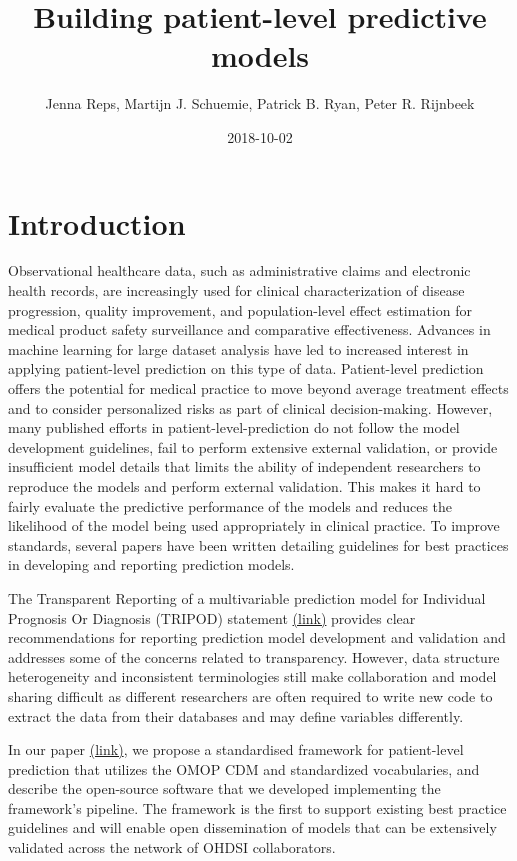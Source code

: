 \documentclass[]{article}
\title{Building patient-level predictive models}
\author{Jenna Reps, Martijn J. Schuemie, Patrick B. Ryan, Peter R. Rijnbeek}
\date{2018-10-02}
\begin{document}
\maketitle

{
\setcounter{tocdepth}{3}
\tableofcontents
}
\section{Introduction}\label{introduction}

Observational healthcare data, such as administrative claims and
electronic health records, are increasingly used for clinical
characterization of disease progression, quality improvement, and
population-level effect estimation for medical product safety
surveillance and comparative effectiveness. Advances in machine learning
for large dataset analysis have led to increased interest in applying
patient-level prediction on this type of data. Patient-level prediction
offers the potential for medical practice to move beyond average
treatment effects and to consider personalized risks as part of clinical
decision-making. However, many published efforts in
patient-level-prediction do not follow the model development guidelines,
fail to perform extensive external validation, or provide insufficient
model details that limits the ability of independent researchers to
reproduce the models and perform external validation. This makes it hard
to fairly evaluate the predictive performance of the models and reduces
the likelihood of the model being used appropriately in clinical
practice. To improve standards, several papers have been written
detailing guidelines for best practices in developing and reporting
prediction models.

The Transparent Reporting of a multivariable prediction model for
Individual Prognosis Or Diagnosis (TRIPOD) statement
\href{https://www.equator-network.org/reporting-guidelines/tripod-statement/}{(link)}
provides clear recommendations for reporting prediction model
development and validation and addresses some of the concerns related to
transparency. However, data structure heterogeneity and inconsistent
terminologies still make collaboration and model sharing difficult as
different researchers are often required to write new code to extract
the data from their databases and may define variables differently.

In our paper
\href{https://academic.oup.com/jamia/article/25/8/969/4989437}{(link)},
we propose a standardised framework for patient-level prediction that
utilizes the OMOP CDM and standardized vocabularies, and describe the
open-source software that we developed implementing the framework's
pipeline. The framework is the first to support existing best practice
guidelines and will enable open dissemination of models that can be
extensively validated across the network of OHDSI collaborators.
\end{document}
